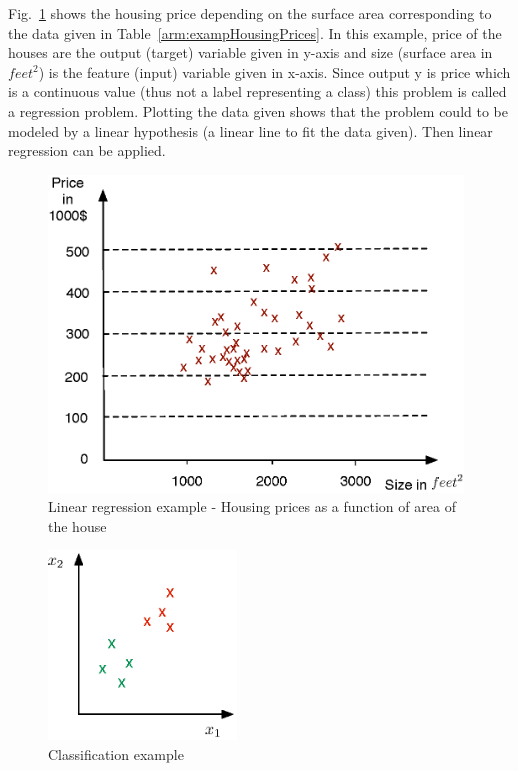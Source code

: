 
Fig.~\ref{fig:housingPrices} shows the housing price depending on the surface area corresponding to the data given in Table~\ref{arm:exampHousingPrices}.
In this example, price of the houses are the output (target) variable given in y-axis and size (surface area in $feet^2$) is the feature (input) variable given in x-axis. 
Since output y is price which is a continuous value (thus not a label representing a class) this problem is called a regression problem. Plotting the data given shows that the problem could to be modeled by a linear hypothesis (a linear line to fit the data given). Then linear regression can be applied.

\begin{figure}
\begin{center}
\includegraphics[width=11cm]{figures/linearRegressionExamp}    %
\caption{Linear regression example - Housing prices as a function of area of the house} 
\label{fig:housingPrices}
\end{center}
\end{figure}

\begin{figure}
\begin{center}
\includegraphics[width=5cm]{figures/classificationEx2}    %
\caption{Classification example} 
\label{fig:classificationEx2}
\end{center}
\end{figure}

